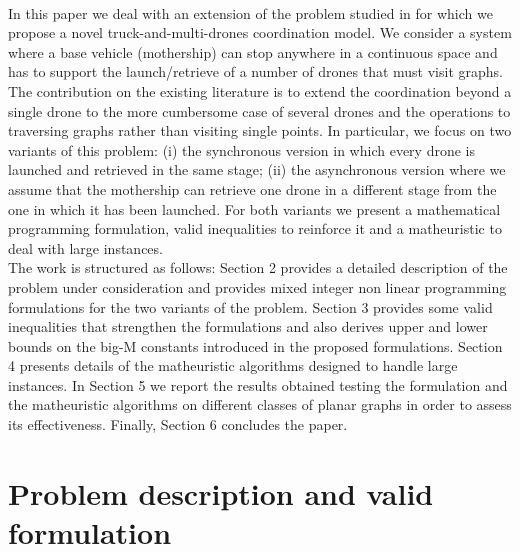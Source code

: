 \documentclass{itor}
\theoremstyle{definition}
\theoremstyle{remark}
\begin{document}
{\\
In this paper we deal with an extension of the problem studied in \cite{art:Amorosi2021} for which we propose a novel truck-and-multi-drones coordination model.} We consider a {system} where a base vehicle (mothership) can stop anywhere in a continuous space and has to support the launch/retrieve of a number of drones that must visit graphs. The contribution on the existing literature is to extend the coordination beyond a single drone to the more cumbersome case of several drones and the operations to traversing graphs rather than visiting single points. {In particular, we focus on two variants of this problem: (i) the synchronous version in which every drone is launched and retrieved in the same stage; (ii) the asynchronous version where we assume that the mothership can retrieve one drone in a different stage from the one in which it has been launched. For both variants we present a mathematical programming formulation, valid inequalities to reinforce it and a matheuristic to deal with large instances.}\\
\noindent
The work is structured as follows: Section 2 provides a detailed description of the problem under consideration and provides  mixed integer non linear programming formulations for the two variants of the problem. Section 3  provides some valid inequalities that strengthen the formulations and also derives upper and lower bounds on the big-M constants introduced in the proposed formulations. Section 4 presents details of the matheuristic algorithms designed to handle large instances. In Section 5 we report the results obtained testing the formulation and the matheuristic algorithms on different classes of planar graphs in order to assess its effectiveness. Finally, Section 6 concludes the paper.

\section{Problem description and valid formulation}\label{section:desc}
\end{document}
